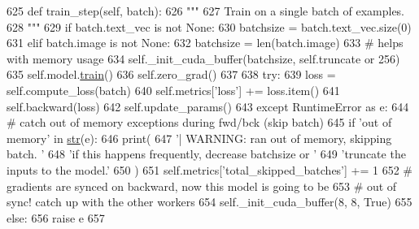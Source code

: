 \begin{DoxyCode}
625     \textcolor{keyword}{def }train\_step(self, batch):
626         \textcolor{stringliteral}{"""}
627 \textcolor{stringliteral}{        Train on a single batch of examples.}
628 \textcolor{stringliteral}{        """}
629         \textcolor{keywordflow}{if} batch.text\_vec \textcolor{keywordflow}{is} \textcolor{keywordflow}{not} \textcolor{keywordtype}{None}:
630             batchsize = batch.text\_vec.size(0)
631         \textcolor{keywordflow}{elif} batch.image \textcolor{keywordflow}{is} \textcolor{keywordflow}{not} \textcolor{keywordtype}{None}:
632             batchsize = len(batch.image)
633         \textcolor{comment}{# helps with memory usage}
634         self.\_init\_cuda\_buffer(batchsize, self.truncate \textcolor{keywordflow}{or} 256)
635         self.model.\hyperlink{namespaceprojects_1_1mastering__the__dungeon_1_1mturk_1_1tasks_1_1MTD_1_1run_a36a5f4f6f9df0611a6818610518d2cf0}{train}()
636         self.zero\_grad()
637 
638         \textcolor{keywordflow}{try}:
639             loss = self.compute\_loss(batch)
640             self.metrics[\textcolor{stringliteral}{'loss'}] += loss.item()
641             self.backward(loss)
642             self.update\_params()
643         \textcolor{keywordflow}{except} RuntimeError \textcolor{keyword}{as} e:
644             \textcolor{comment}{# catch out of memory exceptions during fwd/bck (skip batch)}
645             \textcolor{keywordflow}{if} \textcolor{stringliteral}{'out of memory'} \textcolor{keywordflow}{in} \hyperlink{namespacegenerate__task__READMEs_a5b88452ffb87b78c8c85ececebafc09f}{str}(e):
646                 print(
647                     \textcolor{stringliteral}{'| WARNING: ran out of memory, skipping batch. '}
648                     \textcolor{stringliteral}{'if this happens frequently, decrease batchsize or '}
649                     \textcolor{stringliteral}{'truncate the inputs to the model.'}
650                 )
651                 self.metrics[\textcolor{stringliteral}{'total\_skipped\_batches'}] += 1
652                 \textcolor{comment}{# gradients are synced on backward, now this model is going to be}
653                 \textcolor{comment}{# out of sync! catch up with the other workers}
654                 self.\_init\_cuda\_buffer(8, 8, \textcolor{keyword}{True})
655             \textcolor{keywordflow}{else}:
656                 \textcolor{keywordflow}{raise} e
657 
\end{DoxyCode}
\mbox{\label{classparlai_1_1core_1_1torch__generator__agent_1_1TorchGeneratorAgent_a9b840de6769acee3aac913d25c448a1d}} 
